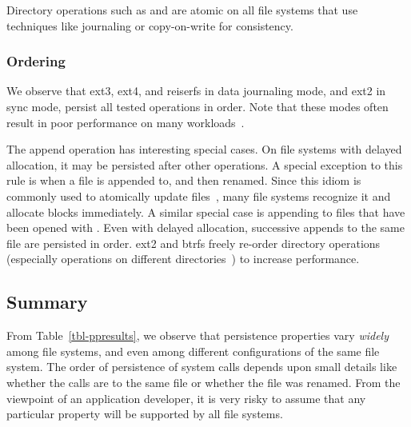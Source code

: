 Directory operations such as  and  are atomic
on all file systems that use techniques like journaling or copy-on-write for
consistency. 

\subsubsection{Ordering}

We observe that ext3, ext4, and reiserfs in data journaling mode, and ext2 in
sync mode, persist all tested operations in order. Note that these modes often
result in poor performance on many workloads~\cite{PrabhakaranEtAl05-Usenix}.

The append operation has interesting special cases. On file systems with
delayed allocation, it may be persisted after other operations. A special
exception to this rule is when a file is appended to, and then renamed. Since
this idiom is commonly used to atomically update
files~\cite{URLmassivefsthread}, many file systems recognize it and allocate
blocks immediately. A similar special case is appending to files that have
been opened with . Even with delayed allocation, successive
appends to the same file are persisted in order. ext2 and btrfs freely
re-order directory operations (especially operations on different
directories~\cite{btrfs-mason}) to increase performance.

\subsection{Summary}

From Table~\ref{tbl-ppresults}, we observe that persistence properties vary
\textit{widely} among file systems, and even among different configurations of
the same file system. The order of persistence of system calls depends upon
small details like whether the calls are to the same file or whether the file was
renamed. From the viewpoint of an application developer, it is very risky to
assume that any particular property will be supported by all file systems. 
